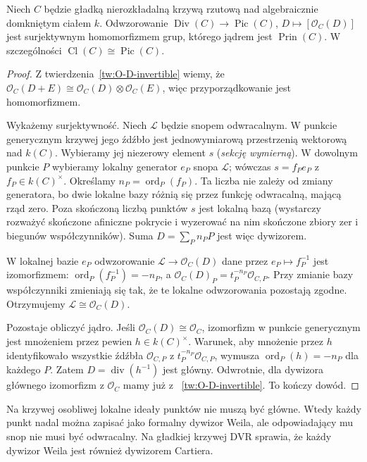 \begin{twierdzenie}
\label{tw:Pic-div}
Niech $C$ będzie gładką nierozkładalną krzywą
rzutową nad algebraicznie domkniętym ciałem $k$.
Odwzorowanie
$\operatorname{Div}(C)\to\operatorname{Pic}(C)$,
$D\mapsto[\mathcal O_C(D)]$ jest surjektywnym
homomorfizmem grup, którego jądrem jest
$\operatorname{Prin}(C)$. W szczególności
$\operatorname{Cl}(C)\cong\operatorname{Pic}(C)$.
\end{twierdzenie}
\begin{proof}
Z twierdzenia~\ref{tw:O-D-invertible} wiemy, że
$\mathcal O_C(D+E)\cong\mathcal O_C(D)\otimes
\mathcal O_C(E)$, więc przyporządkowanie jest
homomorfizmem.

Wykażemy surjektywność. Niech $\mathcal L$ będzie
snopem odwracalnym. W punkcie generycznym krzywej
jego źdźbło jest jednowymiarową przestrzenią
wektorową nad $k(C)$. Wybieramy jej niezerowy
element $s$ (\emph{sekcję wymierną}). W dowolnym
punkcie $P$ wybieramy lokalny generator $e_P$
snopa $\mathcal L$; wówczas $s=f_Pe_P$ z
$f_P\in k(C)^\times$. Określamy
$n_P=\operatorname{ord}_P(f_P)$. Ta liczba nie
zależy od zmiany generatora, bo dwie lokalne
bazy różnią się przez funkcję odwracalną,
mającą rząd zero. Poza skończoną liczbą punktów
$s$ jest lokalną bazą (wystarczy rozważyć
skończone afiniczne pokrycie i wyzerować na nim
skończone zbiory zer i biegunów współczynników).
Suma $D=\sum_P n_PP$ jest więc dywizorem.

W lokalnej bazie $e_P$ odwzorowanie
$\mathcal L\to\mathcal O_C(D)$ dane przez
$e_P\mapsto f_P^{-1}$ jest izomorfizmem:
$\operatorname{ord}_P(f_P^{-1})=-n_P$, a
$\mathcal O_C(D)_P=t_P^{-n_P}\mathcal O_{C,P}$.
Przy zmianie bazy współczynniki zmieniają się
tak, że te lokalne odwzorowania pozostają
zgodne. Otrzymujemy $\mathcal L\cong\mathcal O_C(D)$.

Pozostaje obliczyć jądro. Jeśli
$\mathcal O_C(D)\cong\mathcal O_C$, izomorfizm
w punkcie generycznym jest mnożeniem przez
pewien $h\in k(C)^\times$. Warunek, aby
mnożenie przez $h$ identyfikowało wszystkie
źdźbła $\mathcal O_{C,P}$ z
$t_P^{-n_P}\mathcal O_{C,P}$, wymusza
$\operatorname{ord}_P(h)=-n_P$ dla każdego $P$.
Zatem $D=\operatorname{div}(h^{-1})$ jest główny.
Odwrotnie, dla dywizora głównego izomorfizm
z $\mathcal O_C$ mamy już z
~\ref{tw:O-D-invertible}. To kończy dowód.
\end{proof}

\begin{uwaga}
Na krzywej osobliwej lokalne ideały punktów
nie muszą być główne. Wtedy każdy punkt nadal
można zapisać jako formalny dywizor Weila,
ale odpowiadający mu snop nie musi być odwracalny.
Na gładkiej krzywej DVR sprawia, że każdy
dywizor Weila jest również dywizorem Cartiera.
\end{uwaga}

